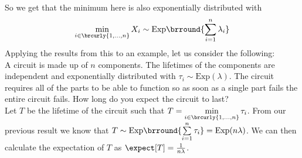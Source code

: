 So we get that the minimum here is also exponentially distributed with
\[\min_{i\in\brcurly{1,\ldots,n}}X_i\sim\mathrm{Exp}\brround{\sum_{i=1}^n \lambda_i}\]
Applying the results from this to an example, let us consider the following:\\
A circuit is made up of $n$ components. The lifetimes of the components are independent and exponentially distributed with $\tau_i\sim\mathrm{Exp}(\lambda)$. The circuit requires all of the parts to be able to function so as soon as a single part fails the entire circuit fails. How long do you expect the circuit to last?\\
Let $T$ be the lifetime of the circuit such that $T=\min\limits_{i\in\brcurly{1,\ldots,n}}\tau_i$. From our previous result we know that $T\sim\mathrm{Exp}\brround{\sum\limits_{i=1}^n\tau_i}=\mathrm{Exp}(n\lambda)$. We can then calculate the expectation of $T$ as $\expect[T]=\frac{1}{n\lambda}$.

